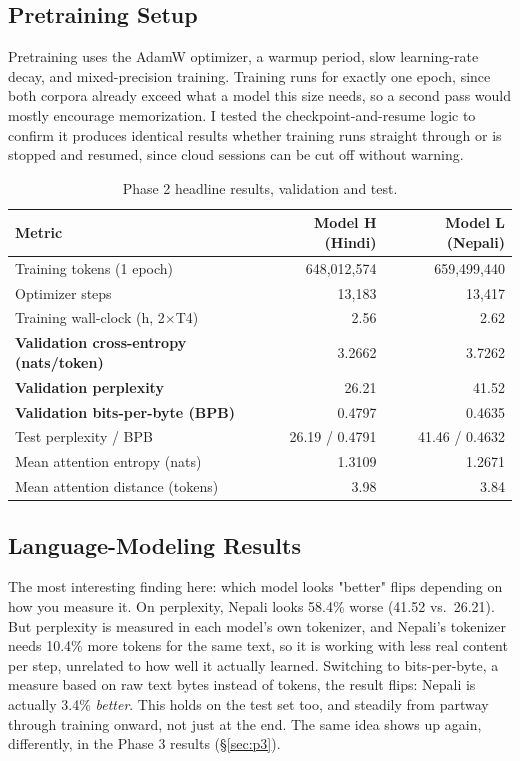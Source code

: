 \documentclass[11pt]{article}
\begin{document}
\subsection{Pretraining Setup}

Pretraining uses the AdamW optimizer, a warmup period, slow learning-rate decay, and mixed-precision training. Training runs for exactly one epoch, since both corpora already exceed what a model this size needs, so a second pass would mostly encourage memorization. I tested the checkpoint-and-resume logic to confirm it produces identical results whether training runs straight through or is stopped and resumed, since cloud sessions can be cut off without warning.

\begin{table}[h]
\centering\small
\begin{tabular}{lrr}
\toprule
\textbf{Metric} & \textbf{Model H (Hindi)} & \textbf{Model L (Nepali)} \\
\midrule
Training tokens (1 epoch) & 648,012,574 & 659,499,440 \\
Optimizer steps & 13,183 & 13,417 \\
Training wall-clock (h, 2$\times$T4) & 2.56 & 2.62 \\
\textbf{Validation cross-entropy (nats/token)} & 3.2662 & 3.7262 \\
\textbf{Validation perplexity} & 26.21 & 41.52 \\
\textbf{Validation bits-per-byte (BPB)} & 0.4797 & 0.4635 \\
Test perplexity / BPB & 26.19 / 0.4791 & 41.46 / 0.4632 \\
Mean attention entropy (nats) & 1.3109 & 1.2671 \\
Mean attention distance (tokens) & 3.98 & 3.84 \\
\bottomrule
\end{tabular}
\caption{Phase 2 headline results, validation and test.}
\end{table}

\subsection{Language-Modeling Results}

The most interesting finding here: which model looks "better" flips depending on how you measure it. On perplexity, Nepali looks 58.4\% worse (41.52 vs.\ 26.21). But perplexity is measured in each model's own tokenizer, and Nepali's tokenizer needs 10.4\% more tokens for the same text, so it is working with less real content per step, unrelated to how well it actually learned. Switching to bits-per-byte, a measure based on raw text bytes instead of tokens, the result flips: Nepali is actually 3.4\% \emph{better}. This holds on the test set too, and steadily from partway through training onward, not just at the end. The same idea shows up again, differently, in the Phase 3 results (\S\ref{sec:p3}).
\end{document}
